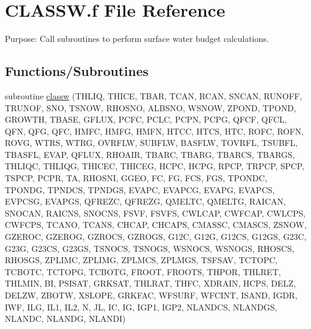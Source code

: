 \hypertarget{CLASSW_8f}{}\section{C\+L\+A\+S\+S\+W.\+f File Reference}
\label{CLASSW_8f}


Purpose\+: Call subroutines to perform surface water budget calculations.  


\subsection*{Functions/\+Subroutines}
\begin{DoxyCompactItemize}
\item 
subroutine \hyperlink{CLASSW_8f_aac1827011ed2ca61bd0274e83d1f80ad}{classw} (T\+H\+L\+I\+Q, T\+H\+I\+C\+E, T\+B\+A\+R, T\+C\+A\+N, R\+C\+A\+N, S\+N\+C\+A\+N, R\+U\+N\+O\+F\+F, T\+R\+U\+N\+O\+F, S\+N\+O, T\+S\+N\+O\+W, R\+H\+O\+S\+N\+O, A\+L\+B\+S\+N\+O, W\+S\+N\+O\+W, Z\+P\+O\+N\+D, T\+P\+O\+N\+D, G\+R\+O\+W\+T\+H, T\+B\+A\+S\+E, G\+F\+L\+U\+X, P\+C\+F\+C, P\+C\+L\+C, P\+C\+P\+N, P\+C\+P\+G, Q\+F\+C\+F, Q\+F\+C\+L, Q\+F\+N, Q\+F\+G, Q\+F\+C, H\+M\+F\+C, H\+M\+F\+G, H\+M\+F\+N, H\+T\+C\+C, H\+T\+C\+S, H\+T\+C, R\+O\+F\+C, R\+O\+F\+N, R\+O\+V\+G, W\+T\+R\+S, W\+T\+R\+G, O\+V\+R\+F\+L\+W, S\+U\+B\+F\+L\+W, B\+A\+S\+F\+L\+W, T\+O\+V\+R\+F\+L, T\+S\+U\+B\+F\+L, T\+B\+A\+S\+F\+L, E\+V\+A\+P, Q\+F\+L\+U\+X, R\+H\+O\+A\+I\+R, T\+B\+A\+R\+C, T\+B\+A\+R\+G, T\+B\+A\+R\+C\+S, T\+B\+A\+R\+G\+S, T\+H\+L\+I\+Q\+C, T\+H\+L\+I\+Q\+G, T\+H\+I\+C\+E\+C, T\+H\+I\+C\+E\+G, H\+C\+P\+C, H\+C\+P\+G, R\+P\+C\+P, T\+R\+P\+C\+P, S\+P\+C\+P, T\+S\+P\+C\+P, P\+C\+P\+R, T\+A, R\+H\+O\+S\+N\+I, G\+G\+E\+O, F\+C, F\+G, F\+C\+S, F\+G\+S, T\+P\+O\+N\+D\+C, T\+P\+O\+N\+D\+G, T\+P\+N\+D\+C\+S, T\+P\+N\+D\+G\+S, E\+V\+A\+P\+C, E\+V\+A\+P\+C\+G, E\+V\+A\+P\+G, E\+V\+A\+P\+C\+S, E\+V\+P\+C\+S\+G, E\+V\+A\+P\+G\+S, Q\+F\+R\+E\+Z\+C, Q\+F\+R\+E\+Z\+G, Q\+M\+E\+L\+T\+C, Q\+M\+E\+L\+T\+G, R\+A\+I\+C\+A\+N, S\+N\+O\+C\+A\+N, R\+A\+I\+C\+N\+S, S\+N\+O\+C\+N\+S, F\+S\+V\+F, F\+S\+V\+F\+S, C\+W\+L\+C\+A\+P, C\+W\+F\+C\+A\+P, C\+W\+L\+C\+P\+S, C\+W\+F\+C\+P\+S, T\+C\+A\+N\+O, T\+C\+A\+N\+S, C\+H\+C\+A\+P, C\+H\+C\+A\+P\+S, C\+M\+A\+S\+S\+C, C\+M\+A\+S\+C\+S, Z\+S\+N\+O\+W, G\+Z\+E\+R\+O\+C, G\+Z\+E\+R\+O\+G, G\+Z\+R\+O\+C\+S, G\+Z\+R\+O\+G\+S, G12\+C, G12\+G, G12\+C\+S, G12\+G\+S, G23\+C, G23\+G, G23\+C\+S, G23\+G\+S, T\+S\+N\+O\+C\+S, T\+S\+N\+O\+G\+S, W\+S\+N\+O\+C\+S, W\+S\+N\+O\+G\+S, R\+H\+O\+S\+C\+S, R\+H\+O\+S\+G\+S, Z\+P\+L\+I\+M\+C, Z\+P\+L\+I\+M\+G, Z\+P\+L\+M\+C\+S, Z\+P\+L\+M\+G\+S, T\+S\+F\+S\+A\+V, T\+C\+T\+O\+P\+C, T\+C\+B\+O\+T\+C, T\+C\+T\+O\+P\+G, T\+C\+B\+O\+T\+G, F\+R\+O\+O\+T, F\+R\+O\+O\+T\+S, T\+H\+P\+O\+R, T\+H\+L\+R\+E\+T, T\+H\+L\+M\+I\+N, B\+I, P\+S\+I\+S\+A\+T, G\+R\+K\+S\+A\+T, T\+H\+L\+R\+A\+T, T\+H\+F\+C, X\+D\+R\+A\+I\+N, H\+C\+P\+S, D\+E\+L\+Z, D\+E\+L\+Z\+W, Z\+B\+O\+T\+W, X\+S\+L\+O\+P\+E, G\+R\+K\+F\+A\+C, W\+F\+S\+U\+R\+F, W\+F\+C\+I\+N\+T, I\+S\+A\+N\+D, I\+G\+D\+R, I\+W\+F, I\+L\+G, I\+L1, I\+L2, N, J\+L, I\+C, I\+G, I\+G\+P1, I\+G\+P2, N\+L\+A\+N\+D\+C\+S, N\+L\+A\+N\+D\+G\+S, N\+L\+A\+N\+D\+C, N\+L\+A\+N\+D\+G, N\+L\+A\+N\+D\+I)
\end{DoxyCompactItemize}


